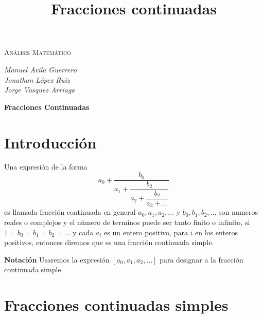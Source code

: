 \documentclass[11pt, article]{article}
\title{Fracciones continuadas}
\author{}
\date{}
\begin{document}
    \begin{center}
    {\scshape\LARGE Análisis Matemático \par}

    \vspace{0.5cm}
    \large{\itshape{Manuel Avila Guerrero}}  \\ 
    \large{\itshape{Jonathan López Ruiz}}  \\
    \large{\itshape{Jorge Vasquez Arriaga}} \\

    {\LARGE \textbf{Fracciones Continuadas} \par}
    \end{center}


\section*{Introducción}
    
    Una expresión de la forma 
    \[
    a_0 + \dfrac{b_0}{a_1+ \dfrac{b_2}{a_2+\dfrac{b_2}{a_3+...}}} 
    \]
    es llamada fracción continuada en general $a_0, a_1,a_2,...$ y $b_0, b_1,b_2,...$ son numeros reales o complejos y el número de terminos puede ser tanto finito o infinito, si $1=b_0=b_1=b_2=...$ y cada $a_i$ es un entero positivo, para $i$ en los enteros positivos, entonces diremos que es una fracción continuada simple.
    
    \textbf{Notación} Usaremos la expresión $[a_0,a_1,a_2, \dots]$ para designar a la fracción continuada simple.
    
\section*{Fracciones continuadas simples}
    
\end{document}
